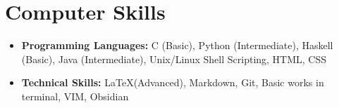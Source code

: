 \documentclass[10pt,a4paper,sans,colorlinks]{moderncv}        %
\begin{document}
\begin{itemize}
\begin{itemize}
	      \end{itemize}

\end{itemize}



\section{Computer Skills}

\begin{itemize}

	\item \textbf{Programming Languages:} C (Basic), Python (Intermediate), Haskell (Basic), Java (Intermediate), Unix/Linux Shell Scripting, HTML, CSS

	\item \textbf{Technical Skills:} \LaTeX (Advanced), Markdown, Git, Basic works in terminal, VIM, Obsidian


\end{itemize}
%
%
%
%
%	


\end{document}
